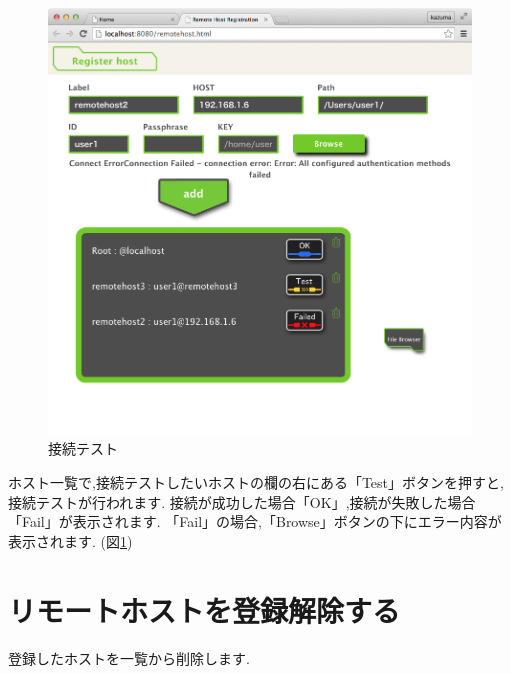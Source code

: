 \documentclass[a4paper,10pt,oneside]{jsbook}
\begin{document}
\begin{figure}[htbp]
	\begin{center}
		\includegraphics[width=12.0cm]{image/remotehost_001.png}
	\end{center}
	\caption{接続テスト}
	\label{fig:remotetest}
\end{figure}

ホスト一覧で,接続テストしたいホストの欄の右にある「Test」ボタンを押すと,接続テストが行われます.
接続が成功した場合「OK」,接続が失敗した場合「Fail」が表示されます.
「Fail」の場合,「Browse」ボタンの下にエラー内容が表示されます.
(図\ref{fig:remotetest})

\newpage
		
\section{リモートホストを登録解除する}
登録したホストを一覧から削除します.
\end{document}
